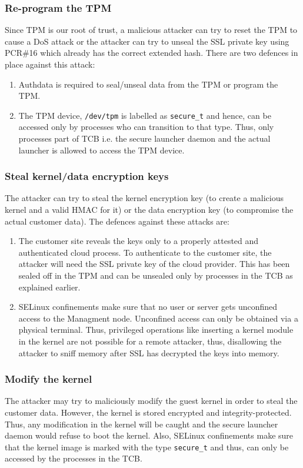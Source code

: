 \documentclass[10pt,twocolumn,pdftex]{article}
\begin{document}
\subsubsection{Re-program the TPM}
Since TPM is our root of trust, a malicious attacker can try to reset the TPM to cause a DoS attack or the attacker can try to unseal the SSL private key using PCR\#16 which already has the correct extended hash. There are two defences in place against this attack:
\begin{enumerate}
\item Authdata is required to seal/unseal data from the TPM or program the TPM.
\item The TPM device, {\tt /dev/tpm} is labelled as {\tt secure\_t} and hence, can be accessed only by processes who can transition to that type. Thus, only processes part of TCB i.e. the secure launcher daemon and the actual launcher is allowed to access the TPM device.
\end{enumerate}

\subsubsection{Steal kernel/data encryption keys}
The attacker can try to steal the kernel encryption key (to create a malicious kernel and a valid HMAC for it) or the data encryption key (to compromise the actual customer data). The defences against these attacks are:
\begin{enumerate}
\item The customer site reveals the keys only to a properly attested and authenticated cloud process. To authenticate to the customer site, the attacker will need the SSL private key of the cloud provider. This has been sealed off in the TPM and can be unsealed only by processes in the TCB as explained earlier. 
\item SELinux confinements make sure that no user or server gets unconfined access to the Managment node. Unconfined access can only be obtained via a physical terminal. Thus, privileged operations like inserting a kernel module in the kernel are not possible for a remote attacker, thus, disallowing the attacker to sniff memory after SSL has decrypted the keys into memory.
\end{enumerate}

\subsubsection{Modify the kernel}
The attacker may try to maliciously modify the guest kernel in order to steal the customer data. However, the kernel is stored encrypted and integrity-protected. Thus, any modification in the kernel will be caught and the secure launcher daemon would refuse to boot the kernel. Also, SELinux confinements make sure that the kernel image is marked with the type {\tt secure\_t} and thus, can only be accessed by the processes in the TCB.
\end{document}
